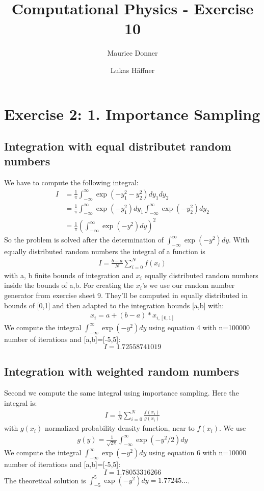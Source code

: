 \documentclass{article}
\title{Computational Physics - Exercise 10}
\author{Maurice Donner \and Lukas Häffner}
\begin{document}
\maketitle
\newpage

\section*{Exercise 2: 1. Importance Sampling}
\subsection*{Integration with equal distributet random numbers}
We have to compute the following integral:
\begin{align}
I &= \frac{1}{\pi} \int_{-\infty}^{\infty} \exp(-y_1^{2}-y_2^{2}) dy_1 dy_2\\
&= \frac{1}{\pi} \int_{-\infty}^{\infty} \exp(-y_1^{2}) dy_1 \int_{-\infty}^{\infty} \exp(-y_2^{2}) dy_2\\
&= \frac{1}{\pi} (\int_{-\infty}^{\infty} \exp(-y^{2}) dy)^2
\end{align}
So the problem is solved after the determination of \(\int_{-\infty}^{\infty} \exp(-y^{2}) dy\).
With equally distributed random numbers the integral of a function is
\begin{align}
I = \frac{b-a}{N}\sum\limits_{i=0}^{N} f(x_i)
\end{align}
with a, b finite bounds of integration and \(x_i\) equally distributed random numbers inside the bounds of a,b.
For creating the \(x_i\)'s we use our random number generator from exercise sheet 9. They'll be computed in equally distributed in bounds of [0,1] and then adapted to the integration bounds [a,b] with:
\begin{align}
x_i = a + (b-a)*x_{i,[0,1]}
\end{align}
We compute the integral \(\int_{-\infty}^{\infty} \exp(-y^{2}) dy\) using equation 4 with n=100000 number of iterations and [a,b]=[-5,5]:
\[ I = 1.72558741019\]

\subsection*{Integration with weighted random numbers}
Second we compute the same integral using importance sampling. Here the integral is:
\begin{align}
I = \frac{1}{N}\sum\limits_{i=0}^{N} \frac{f(x_i)}{g(x_i)}
\end{align}
with \(g(x_i)\) normalized probability density function, near to \(f(x_i)\). We use
\begin{align}
g(y) = \frac{1}{\sqrt{2\pi}}\int_{-\infty}^{\infty} \exp(-y^{2}/2) dy
\end{align}
We compute the integral \(\int_{-\infty}^{\infty} \exp(-y^{2}) dy\) using equation 6 with n=10000 number of iterations and [a,b]=[-5,5]:
\[ I = 1.78053316266\]
The theoretical solution is \(\int_{-5}^{5} \exp(-y^{2}) dy = 1.77245...\).
\newpage
\end{document}
